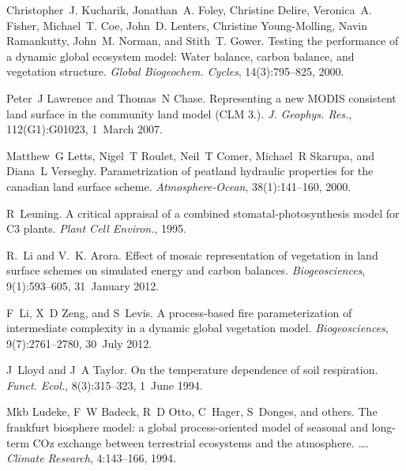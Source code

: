 \begin{DoxyDescription}
\item[\label{_CITEREF_Kucharik2000-xk}%
\mbox{[}32\mbox{]}]Christopher~J. Kucharik, Jonathan~A. Foley, Christine Delire, Veronica~A. Fisher, Michael~T. Coe, John~D. Lenters, Christine Young-\/\+Molling, Navin Ramankutty, John~M. Norman, and Stith~T. Gower. Testing the performance of a dynamic global ecosystem model\+: Water balance, carbon balance, and vegetation structure. {\itshape Global Biogeochem. Cycles}, 14(3)\+:795--825, 2000. 


\item[\label{_CITEREF_Lawrence2007-bc}%
\mbox{[}33\mbox{]}]Peter~J Lawrence and Thomas~N Chase. Representing a new M\+O\+D\+I\+S consistent land surface in the community land model (C\+L\+M 3.). {\itshape J. Geophys. Res.}, 112(G1)\+:G01023, 1~March 2007. 


\item[\label{_CITEREF_Letts2000-pg}%
\mbox{[}34\mbox{]}]Matthew~G Letts, Nigel~T Roulet, Neil~T Comer, Michael~R Skarupa, and Diana~L Verseghy. Parametrization of peatland hydraulic properties for the canadian land surface scheme. {\itshape Atmosphere-\/\+Ocean}, 38(1)\+:141--160, 2000. 


\item[\label{_CITEREF_Leuning1995-ab}%
\mbox{[}35\mbox{]}]R~Leuning. A critical appraisal of a combined stomatal-\/photosynthesis model for C3 plants. {\itshape Plant Cell Environ.}, 1995.


\item[\label{_CITEREF_Li2012-f7f}%
\mbox{[}36\mbox{]}]R.~Li and V.~K. Arora. Effect of mosaic representation of vegetation in land surface schemes on simulated energy and carbon balances. {\itshape Biogeosciences}, 9(1)\+:593--605, 31~January 2012. 


\item[\label{_CITEREF_Li20121c2}%
\mbox{[}37\mbox{]}]F~Li, X~D Zeng, and S~Levis. A process-\/based fire parameterization of intermediate complexity in a dynamic global vegetation model. {\itshape Biogeosciences}, 9(7)\+:2761--2780, 30~July 2012. 


\item[\label{_CITEREF_Lloyd1994-ct}%
\mbox{[}38\mbox{]}]J~Lloyd and J~A Taylor. On the temperature dependence of soil respiration. {\itshape Funct. Ecol.}, 8(3)\+:315--323, 1~June 1994. 


\item[\label{_CITEREF_Ludeke1994-px}%
\mbox{[}39\mbox{]}]Mkb Ludeke, F~W Badeck, R~D Otto, C~Hager, S~Donges, and others. The frankfurt biosphere model\+: a global process-\/oriented model of seasonal and long-\/term C\+Oz exchange between terrestrial ecosystems and the atmosphere. …. {\itshape Climate Research}, 4\+:143--166, 1994.



\end{DoxyDescription}

